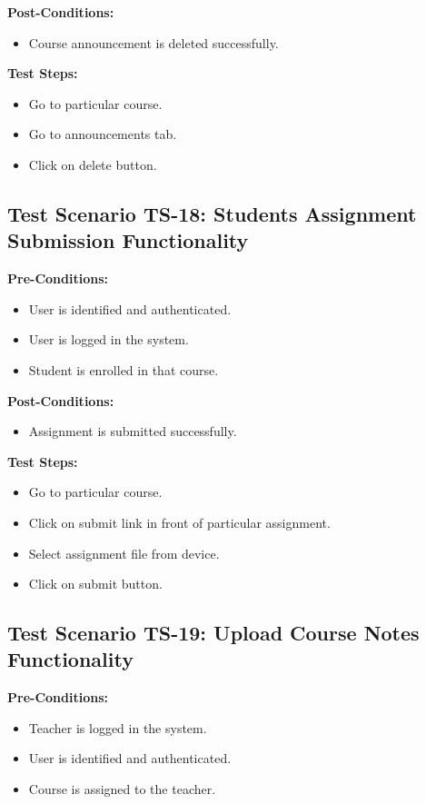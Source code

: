 \textbf{Post-Conditions: }
\begin{itemize}

\item Course announcement is deleted successfully.

\end{itemize}
\textbf{Test Steps:}
\begin{itemize}

\item Go to particular course.
\item Go to announcements tab.
\item Click on delete button.

\end{itemize}



\subsection{Test Scenario TS-18: Students Assignment Submission Functionality}
\textbf{Pre-Conditions: }
\begin{itemize}

\item User is identified and authenticated.
\item User is logged in the system.
\item Student is enrolled in that course.

\end{itemize}

\textbf{Post-Conditions: }
\begin{itemize}

\item Assignment is submitted successfully.

\end{itemize}
\textbf{Test Steps:}
\begin{itemize}

\item Go to particular course.
\item Click on submit link in front of particular assignment.
\item Select assignment file from device.
\item Click on submit button.

\end{itemize}


\subsection{Test Scenario TS-19: Upload Course Notes Functionality}
\textbf{Pre-Conditions: }
\begin{itemize}

\item Teacher is logged in the system.
\item User is identified and authenticated.
\item Course is assigned to the teacher.

\end{itemize}


